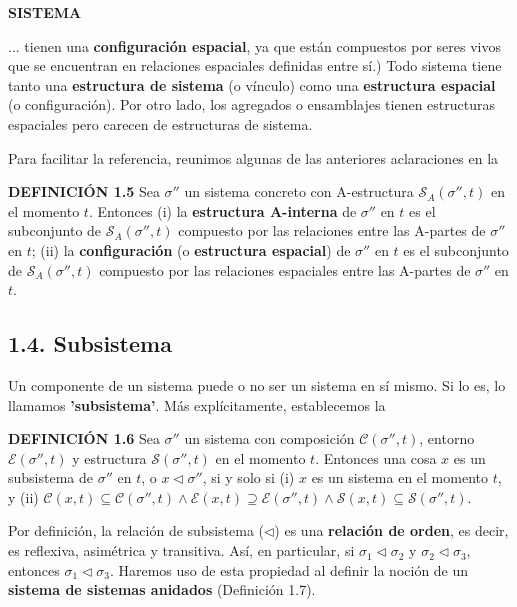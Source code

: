 \fancyhf{}
\fancyhead[r]{\thepage} 
\begin{center}
{\fontsize{16}{18}\selectfont \textbf{SISTEMA}}
\end{center}
\vspace{0.5cm}

{\fontsize{13}{15}\selectfont
... tienen una \textbf{configuración espacial}, ya que están compuestos por seres vivos que se encuentran en relaciones espaciales definidas entre sí.) Todo sistema tiene tanto una \textbf{estructura de sistema} (o vínculo) como una \textbf{estructura espacial} (o configuración). Por otro lado, los agregados o ensamblajes tienen estructuras espaciales pero carecen de estructuras de sistema.

Para facilitar la referencia, reunimos algunas de las anteriores aclaraciones en la

\textbf{DEFINICIÓN 1.5} Sea $\sigma''$ un sistema concreto con A-estructura $\mathcal{S}_A(\sigma'', t)$ en el momento $t$. Entonces
(i) la \textbf{estructura A-interna} de $\sigma''$ en $t$ es el subconjunto de $\mathcal{S}_A(\sigma'', t)$ compuesto por las relaciones entre las A-partes de $\sigma''$ en $t$;
(ii) la \textbf{configuración} (o \textbf{estructura espacial}) de $\sigma''$ en $t$ es el subconjunto de $\mathcal{S}_A(\sigma'', t)$ compuesto por las relaciones espaciales entre las A-partes de $\sigma''$ en $t$.

\subsection*{1.4. Subsistema}
Un componente de un sistema puede o no ser un sistema en sí mismo. Si lo es, lo llamamos \textbf{'subsistema'}. Más explícitamente, establecemos la

\textbf{DEFINICIÓN 1.6} Sea $\sigma''$ un sistema con composición $\mathcal{C}(\sigma'', t)$, entorno $\mathcal{E}(\sigma'', t)$ y estructura $\mathcal{S}(\sigma'', t)$ en el momento $t$. Entonces una cosa $x$ es un subsistema de $\sigma''$ en $t$, o $x \triangleleft \sigma''$, si y solo si
(i) $x$ es un sistema en el momento $t$, y
(ii) $\mathcal{C}(x, t) \subseteq \mathcal{C}(\sigma'', t) \land \mathcal{E}(x, t) \supseteq \mathcal{E}(\sigma'', t) \land \mathcal{S}(x, t) \subseteq \mathcal{S}(\sigma'', t)$.

Por definición, la relación de subsistema ($\triangleleft$) es una \textbf{relación de orden}, es decir, es reflexiva, asimétrica y transitiva. Así, en particular, si $\sigma_1 \triangleleft \sigma_2$ y $\sigma_2 \triangleleft \sigma_3$, entonces $\sigma_1 \triangleleft \sigma_3$. Haremos uso de esta propiedad al definir la noción de un \textbf{sistema de sistemas anidados} (Definición 1.7).

}
